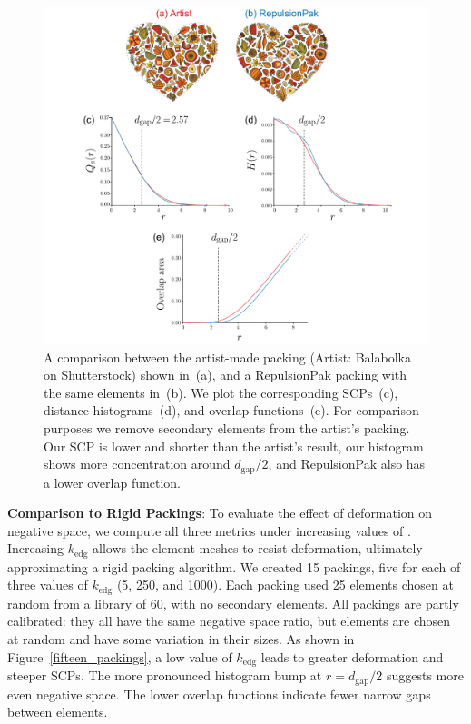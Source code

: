 \begin{figure}
\centering
\includegraphics[width=1.0\textwidth]{figures/metrics/balabolka_comparison_big.pdf}
\caption[A comparison between the artist-made packing \newline  and a RepulsionPak packing]
{ \label{balabolka_comparison} 
A comparison between the artist-made packing (Artist: Balabolka on Shutterstock) shown in~(a), and a RepulsionPak packing
with the same elements in~(b).  We plot the corresponding SCPs~(c),
distance histograms~(d), and overlap functions~(e).
For comparison purposes we remove secondary elements from the artist's
packing.  Our SCP is lower and shorter than the artist's result,
our histogram shows more concentration around $d_\mathrm{gap} / 2$,
and RepulsionPak also has a lower overlap function.
}
\end{figure}

\textbf{Comparison to Rigid Packings}: 
To evaluate the effect of deformation on negative space, we compute all three metrics under
increasing values of  .  
Increasing $k_\mathrm{edg}$
allows the element meshes to resist deformation, ultimately
approximating a rigid packing algorithm.  We created 15 packings,
five for each of three values of $k_\mathrm{edg}$ (5, 250, and 1000).  Each packing
used 25 elements chosen at random from a library of 60, with
no secondary elements.  
All packings are partly calibrated: they all have the same negative
space ratio, but elements are chosen at random and have some
variation in their sizes.
As shown in Figure~\ref{fifteen_packings}, a low value of
$k_\mathrm{edg}$ leads to greater deformation and steeper SCPs.
The more pronounced histogram bump at $r=d_\mathrm{gap}/2$ suggests
more even negative space.
The lower overlap functions indicate fewer narrow gaps between elements.

